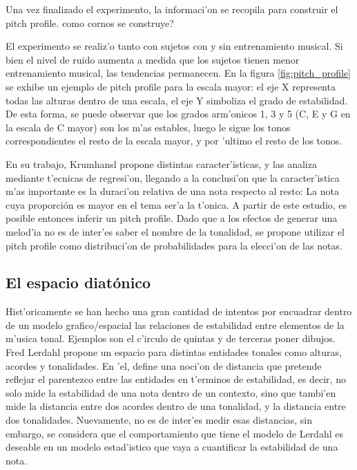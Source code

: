 Una vez finalizado el experimento, la informaci'on se recopila para construir el pitch profile. \alert{como cornos se construye?}

El experimento se realiz'o tanto con sujetos con y sin entrenamiento musical. Si bien el nivel de ruido aumenta a medida que los sujetos 
tienen menor entrenamiento musical, las tendencias permanecen. En la figura \ref{fig:pitch_profile} se exhibe un ejemplo de pitch profile para la escala mayor: 
el eje X representa todas las alturas dentro de una escala, el eje Y simboliza el grado de estabilidad. De esta forma, se puede observar que los grados arm'onicos
1, 3 y 5 (C, E y G en la escala de C mayor) son los m'as estables, luego le sigue los tonos correspondientes el resto de la escala mayor, y por 'ultimo el resto de los 
tonos.


\begin{imagen}
    \width{10cm}
\end{imagen}


En su trabajo, Krumhansl propone distintas caracter'isticas, y las analiza mediante t'ecnicas de regresi'on, llegando a la conclusi'on que la
caracter'istica m'as importante es la duraci'on relativa de una nota respecto al resto: La nota cuya proporci\'on es mayor en el tema ser'a la t'onica. A partir de este 
estudio, es posible entonces inferir un pitch profile. Dado que a los efectos de generar una melod'ia no es de inter'es saber el nombre de la tonalidad, se propone 
utilizar el pitch profile como distribuci'on de probabilidades para la elecci'on de las notas.

\subsection{El espacio diat\'onico}
Hist'oricamente se han hecho una gran cantidad de intentos por encuadrar dentro de un modelo grafico/espacial las relaciones de estabilidad entre elementos de la m'usica
tonal. Ejemplos son el c'irculo de quintas y de terceras \alert{poner dibujos}. Fred Lerdahl \citep{Lerdahl2001} propone un espacio para distintas entidades tonales como alturas, 
acordes y tonalidades. En 'el, define una noci'on de distancia que pretende reflejar el parentezco entre las entidades en t'erminos de estabilidad, es decir, no solo 
mide la estabilidad de una nota dentro de un contexto, sino que tambi'en mide la distancia entre dos acordes dentro de una tonalidad, y la distancia entre dos tonalidades. 
Nuevamente, no es de inter'es medir esas distancias, sin embargo, se considera que el comportamiento que tiene el modelo de Lerdahl es deseable en un modelo estad'istico
que vaya a cuantificar la estabilidad de una nota.

